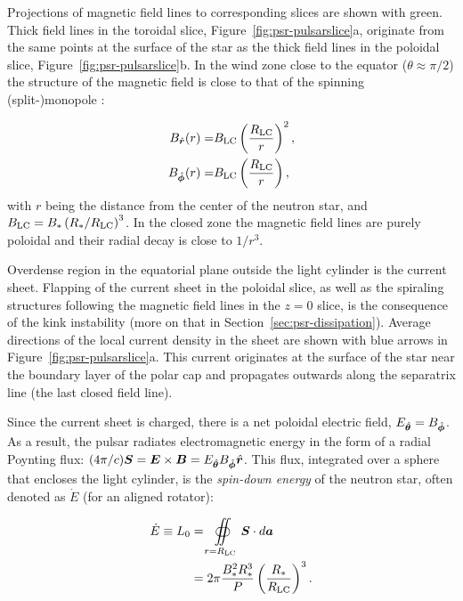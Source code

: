Projections of magnetic field lines to corresponding slices are shown with green. Thick field lines in the toroidal slice, Figure~\ref{fig:psr-pulsarslice}a, originate from the same points at the surface of the star as the thick field lines in the poloidal slice, Figure~\ref{fig:psr-pulsarslice}b. In the wind zone close to the equator ($\theta\approx \pi/2$) the structure of the magnetic field is close to that of the spinning (split-)monopole \citep{1973ApJ...180L.133M}:

\begin{equation}
\begin{split}
\label{eq:psr-bfields}
    B_{{\hat{\bm{r}}}}(r) =& B_{\rm LC}\left(\frac{R_{\rm LC}}{r}\right)^2,\\
    B_{{\hat{\bm{\phi}}}}(r) =& B_{\rm LC}\left(\frac{R_{\rm LC}}{r}\right),
\end{split}
\end{equation}
\noindent with $r$ being the distance from the center of the neutron star, and $B_{\rm LC} = B_*\left(R_*/R_{\rm LC}\right)^3$. In the closed zone the magnetic field lines are purely poloidal and their radial decay is close to $1/r^3$. 

Overdense region in the equatorial plane outside the light cylinder is the current sheet. Flapping of the current sheet in the poloidal slice, as well as the spiraling structures following the magnetic field lines in the $z=0$ slice, is the consequence of the kink instability (more on that in Section~\ref{sec:psr-dissipation}). Average directions of the local current density in the sheet are shown with blue arrows in Figure~\ref{fig:psr-pulsarslice}a. This current originates at the surface of the star near the boundary layer of the polar cap and propagates outwards along the separatrix line (the last closed field line). 

Since the current sheet is charged, there is a net poloidal electric field, $E_{{\hat{\bm{\theta}}}} = B_{{\hat{\bm{\phi}}}}$. As a result, the pulsar radiates electromagnetic energy in the form of a radial Poynting flux: $(4\pi / c)\bm{S} = \bm{E}\times\bm{B} = E_{{\hat{\bm{\theta}}}} B_{{\hat{\bm{\phi}}}} {\hat{\bm{r}}}$. This flux, integrated over a sphere that encloses the light cylinder, is the \emph{spin-down energy} of the neutron star, often denoted as $\dot{E}$ (for an aligned rotator):

\begin{equation}
\label{eq:psr-edot}
\begin{split}
    \dot{E} \equiv L_0 &= \oiint\limits_{r=R_{\rm LC}} \bm{S} \cdot d\bm{a} \\
    &= 2\pi \frac{B_*^2 R_*^3}{P}\left(\frac{R_*}{R_{\rm LC}}\right)^3.
\end{split}
\end{equation}

